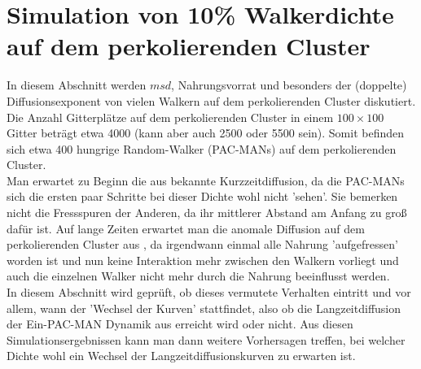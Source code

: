 \documentclass[a4paper, 12pt]{report}
\begin{document}
\section{Simulation von 10\% Walkerdichte auf dem perkolierenden Cluster}
In diesem Abschnitt werden $msd$, Nahrungsvorrat und besonders der (doppelte) Diffusionsexponent von vielen Walkern auf dem perkolierenden Cluster diskutiert. Die Anzahl Gitterplätze auf dem perkolierenden Cluster in einem $100\times 100$ Gitter beträgt etwa 4000 (kann aber auch 2500 oder 5500 sein). Somit befinden sich etwa 400 hungrige Random-Walker (PAC-MANs) auf dem perkolierenden Cluster. 
\\
\noindent Man erwartet zu Beginn die aus \cite{doi:10.1063/1.4999485} bekannte Kurzzeitdiffusion, da die PAC-MANs sich die ersten paar Schritte bei dieser Dichte wohl nicht 'sehen'. Sie bemerken nicht die Fressspuren der Anderen, da ihr mittlerer Abstand am Anfang zu groß dafür ist. Auf lange Zeiten erwartet man die anomale Diffusion auf dem perkolierenden Cluster aus \cite{PhysRevLett.50.77}, da irgendwann einmal alle Nahrung 'aufgefressen' worden ist und nun keine Interaktion mehr zwischen den Walkern vorliegt und auch die einzelnen Walker nicht mehr durch die Nahrung beeinflusst werden.
\\
\noindent In diesem Abschnitt wird geprüft, ob dieses vermutete Verhalten eintritt und vor allem, wann der 'Wechsel der Kurven' stattfindet, also ob die Langzeitdiffusion der Ein-PAC-MAN Dynamik aus \cite{doi:10.1063/1.4999485} erreicht wird oder nicht. Aus diesen Simulationsergebnissen kann man dann weitere Vorhersagen treffen, bei welcher Dichte wohl ein Wechsel der Langzeitdiffusionskurven zu erwarten ist.
\end{document}
